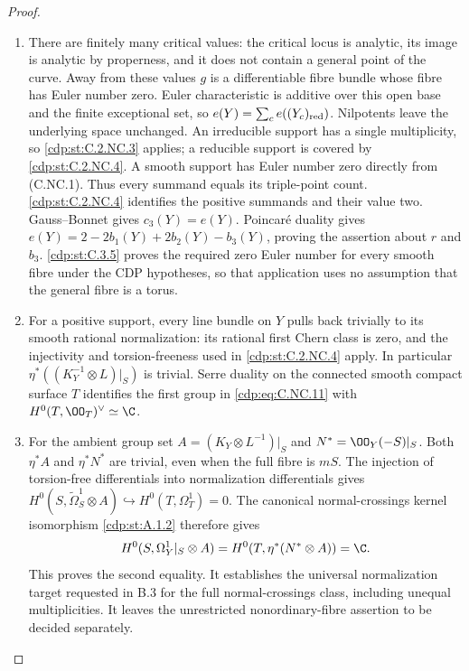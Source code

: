 \begin{proof}

\begin{enumerate}[label={$\langle1\rangle$\arabic*.},leftmargin=*]
\item There are finitely many critical values: the critical locus is analytic, its image is analytic by properness, and it does not contain a general point of the curve. Away from these values $g$ is a differentiable fibre bundle whose fibre has Euler number zero. Euler characteristic is additive over this open base and the finite exceptional set, so $e(Y)=\sum_c e((Y_c)_{\rm red})$. Nilpotents leave the underlying space unchanged. An irreducible support has a single multiplicity, so \ref{cdp:st:C.2.NC.3} applies; a reducible support is covered by \ref{cdp:st:C.2.NC.4}. A smooth support has Euler number zero directly from (C.NC.1). Thus every summand equals its triple-point count. \ref{cdp:st:C.2.NC.4} identifies the positive summands and their value two. Gauss--Bonnet gives $c_3(Y)=e(Y)$. Poincaré duality gives $e(Y)=2-2b_1(Y)+2b_2(Y)-b_3(Y)$, proving the assertion about $r$ and $b_3$. \ref{cdp:st:C.3.5} proves the required zero Euler number for every smooth fibre under the CDP hypotheses, so that application uses no assumption that the general fibre is a torus.

\item For a positive support, every line bundle on $Y$ pulls back trivially to its smooth rational normalization: its rational first Chern class is zero, and the injectivity and torsion-freeness used in \ref{cdp:st:C.2.NC.4} apply. In particular $\eta^*((K_Y^{-1}\otimes L)|_S)$ is trivial. Serre duality on the connected smooth compact surface $T$ identifies the first group in \eqref{cdp:eq:C.NC.11} with $H^0(T,\OO_T)^\vee\simeq\C$.

\item For the ambient group set $A=(K_Y\otimes L^{-1})|_S$ and $N^*=\OO_Y(-S)|_S$. Both $\eta^*A$ and $\eta^*N^*$ are trivial, even when the full fibre is $mS$. The injection of torsion-free differentials into normalization differentials gives
$H^0(S,\widetilde\Omega_S^1\otimes A)\hookrightarrow H^0(T,\Omega_T^1)=0$.
The canonical normal-crossings kernel isomorphism \ref{cdp:st:A.1.2} therefore gives
\[
 H^0(S,\Omega_Y^1|_S\otimes A)
 =H^0(T,\eta^*(N^*\otimes A))=\C.
\]
This proves the second equality. It establishes the universal normalization target requested in B.3 for the full normal-crossings class, including unequal multiplicities. It leaves the unrestricted nonordinary-fibre assertion to be decided separately.

\end{enumerate}
\end{proof}
